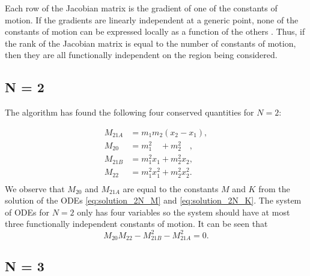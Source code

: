 \documentclass[english,master]{liumaiex}
\theoremstyle{thesisplain}
\theoremstyle{thesisdefinition}
\numberwithin{equation}{section}
\begin{document}
Each row of the Jacobian matrix is the gradient of one of the constants of motion. If the gradients are linearly independent at a generic point, none of the constants of motion can be expressed locally as a function of the others \cite{Olver_1968}. Thus, if the rank of the Jacobian matrix is equal to the number of constants of motion, then they are all functionally independent on the region being considered.

\subsection*{N = 2}

The algorithm has found the following four conserved quantities for $N = 2$:

\begin{align}
	M_{21A} &= m_1 m_2 (x_2 - x_1), \\
	M_{20\phantom{A}} &= m_1^2\phantom{x_1} + m_2^2\phantom{x_2}, \\
	M_{21B} &= m_1^2 x_1 + m_2^2 x_2, \\
	M_{22\phantom{A}} &= m_1^2 x_1^2 + m_2^2 x_2^2. \\
\end{align}
%
We observe that $M_{20}$ and $M_{21A}$ are equal to the constants $M$ and $K$ from the solution of the ODEs \eqref{eq:solution_2N_M} and \eqref{eq:solution_2N_K}.
%
The system of ODEs for $N = 2$ only has four variables so the system should have at most three functionally independent constants of motion. It can be seen that
\begin{equation}
	M_{20}M_{22} - M_{21B}^2 - M_{21A}^2 = 0.
\end{equation}

\subsection*{N = 3}
\end{document}
